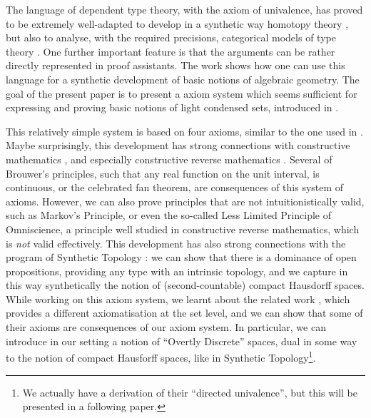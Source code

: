 The language of dependent type theory, with the axiom of univalence, has proved to be extremely well-adapted to
develop in a synthetic way homotopy theory \cite{hott}, but
also to analyse, with the required precisions, categorical models of type theory \cite{vanderweide24}. One
further important feature is that
the arguments can be rather directly represented in proof assistants. The work \cite{draft} shows how one can use
this language for a synthetic development of basic notions of algebraic geometry. The goal of the present paper
is to present a axiom system which seems sufficient for expressing and proving basic notions of light condensed
sets, introduced in \cite{Scholze}.

This relatively simple system is based on four axioms, similar to the one used
in \cite{SAG}. Maybe surprisingly, this development has strong connections with constructive mathematics \cite{Bishop},
and especially constructive reverse mathematics \cite{Ishihara,Diener}. Several of Brouwer's principles, such that
any real function on the unit interval, is continuous, or the celebrated fan theorem, are consequences of this system
of axioms. However, we can also prove principles that are not intuitionistically valid, such as Markov's Principle,
or even the so-called Less Limited Principle of Omniscience, a principle well studied in constructive reverse mathematics,
which is {\em not} valid effectively.  This development has also strong connections with the program of Synthetic
Topology \cite{SyntheticTopologyEscardo,SyntheticTopologyLesnik}:
we can show that there is a dominance of open propositions, providing any type with an intrinsic
topology, and we capture in this way synthetically the notion of (second-countable) compact Hausdorff spaces.
While working on this axiom system, we learnt about the related work \cite{bc24}, which provides a different axiomatisation
at the set level, and we can show that some of their axioms are consequences of our axiom system. In particular, we can introduce
in our setting a notion of ``Overtly Discrete'' spaces, dual in some way to the notion of compact Hausforff spaces, like
in Synthetic Topology\footnote{We actually have a
derivation of their ``directed univalence'', but this will be presented in a following paper.}.

